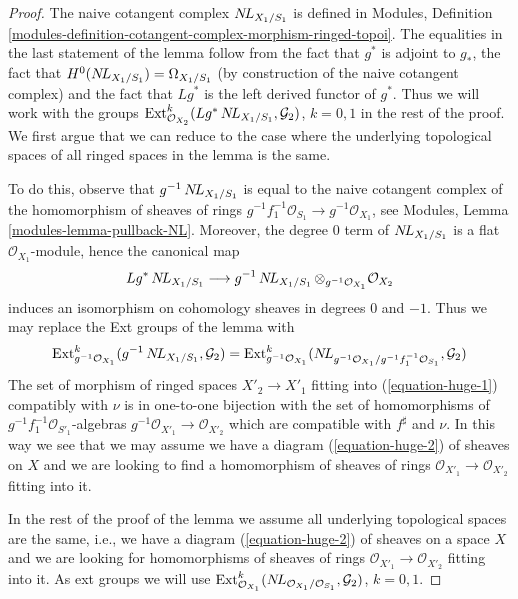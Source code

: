 \begin{proof}
The naive cotangent complex $\mathop{N\!L}\nolimits_{X_1/S_1}$ is defined in Modules, Definition
\ref{modules-definition-cotangent-complex-morphism-ringed-topoi}.
The equalities in the last statement of the lemma follow from
the fact that $g^*$ is adjoint to $g_*$, the fact that
$H^0(\mathop{N\!L}\nolimits_{X_1/S_1}) = \Omega_{X_1/S_1}$ (by construction of the
naive cotangent complex) and the fact that $Lg^*$ is the left
derived functor of $g^*$. Thus we will work with the groups
$\mathop{\mathrm{Ext}}\nolimits^k_{\mathcal{O}_{X_2}}(Lg^*\mathop{N\!L}\nolimits_{X_1/S_1}, \mathcal{G}_2)$,
$k = 0, 1$ in the rest of the proof. We first argue that we can reduce
to the case where the underlying topological spaces of all ringed
spaces in the lemma is the same.

\medskip\noindent
To do this, observe that $g^{-1}\mathop{N\!L}\nolimits_{X_1/S_1}$ is equal to the naive
cotangent complex of the homomorphism of sheaves of rings
$g^{-1}f_1^{-1}\mathcal{O}_{S_1} \to g^{-1}\mathcal{O}_{X_1}$, see
Modules, Lemma \ref{modules-lemma-pullback-NL}.
Moreover, the degree $0$ term of $\mathop{N\!L}\nolimits_{X_1/S_1}$ is a flat
$\mathcal{O}_{X_1}$-module, hence the canonical map
$$
Lg^*\mathop{N\!L}\nolimits_{X_1/S_1}
\longrightarrow
g^{-1}\mathop{N\!L}\nolimits_{X_1/S_1} \otimes_{g^{-1}\mathcal{O}_{X_1}} \mathcal{O}_{X_2}
$$
induces an isomorphism on cohomology sheaves in degrees $0$ and $-1$.
Thus we may replace the Ext groups of the lemma with
$$
\mathop{\mathrm{Ext}}\nolimits^k_{g^{-1}\mathcal{O}_{X_1}}(g^{-1}\mathop{N\!L}\nolimits_{X_1/S_1}, \mathcal{G}_2) =
\mathop{\mathrm{Ext}}\nolimits^k_{g^{-1}\mathcal{O}_{X_1}}(
\mathop{N\!L}\nolimits_{g^{-1}\mathcal{O}_{X_1}/g^{-1}f_1^{-1}\mathcal{O}_{S_1}}, \mathcal{G}_2)
$$
The set of morphism of ringed spaces $X'_2 \to X'_1$ fitting into
(\ref{equation-huge-1}) compatibly with $\nu$
is in one-to-one bijection with
the set of homomorphisms of $g^{-1}f_1^{-1}\mathcal{O}_{S'_1}$-algebras
$g^{-1}\mathcal{O}_{X'_1} \to \mathcal{O}_{X'_2}$ which are compatible with
$f^\sharp$ and $\nu$. In this way we see that we may assume we have a
diagram (\ref{equation-huge-2}) of sheaves on $X$ and we are looking to
find a homomorphism of sheaves of rings
$\mathcal{O}_{X'_1} \to \mathcal{O}_{X'_2}$ fitting into it.

\medskip\noindent
In the rest of the proof of the lemma we assume
all underlying topological spaces are the
same, i.e., we have a diagram (\ref{equation-huge-2}) of sheaves on
a space $X$ and we are looking for homomorphisms of sheaves of rings
$\mathcal{O}_{X'_1} \to \mathcal{O}_{X'_2}$ fitting into it.
As ext groups we will use
$\mathop{\mathrm{Ext}}\nolimits^k_{\mathcal{O}_{X_1}}(
\mathop{N\!L}\nolimits_{\mathcal{O}_{X_1}/\mathcal{O}_{S_1}}, \mathcal{G}_2)$, $k = 0, 1$.


\end{proof}
